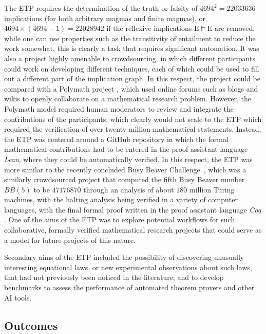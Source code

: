 \documentclass[12pt]{amsart}
\theoremstyle{definition}
\newcommand{\E}{\mathrm{E}}
\begin{document}
The ETP requires the determination of the truth or falsity of $\num{4694}^2 = \num{22033636}$ implications (for both arbitrary magmas and finite magmas), or $\num{4694} \times (\num{4694}-1) = \num{22028942}$ if the reflexive implications ${\E} \models \E$ are removed; while one can use properties such as the transitivity of entailment to reduce the work somewhat, this is clearly a task that requires significant automation. It was also a project highly amenable to crowdsourcing, in which different participants could work on developing different techniques, each of which could be used to fill out a different part of the implication graph. In this respect, the project could be compared with a Polymath project \cite{Gowers2009}, which used online forums such as blogs and wikis to openly collaborate on a mathematical research problem. However, the Polymath model required human moderators to review and integrate the contributions of the participants, which clearly would not scale to the ETP which required the verification of over twenty million mathematical statements. Instead, the ETP was centered around a GitHub repository in which the formal mathematical contributions had to be entered in the proof assistant language \emph{Lean}, where they could be automatically verified. In this respect, the ETP was more similar to the recently concluded Busy Beaver Challenge~\cite{bbchallenge_bb5}, which was a similarly crowdsourced project that computed the fifth Busy Beaver number $BB(5)$ to be $\num{47176870}$ through an analysis of about $180$ million Turing machines, with the halting analysis being verified in a variety of computer languages, with the final formal proof written in the proof assistant language \emph{Coq} \cite{the_coq_development_team_2024_14542673, bbchallenge_bb5}. One of the aims of the ETP was to explore potential workflows for such collaborative, formally verified mathematical research projects that could serve as a model for future projects of this nature.

Secondary aims of the ETP included the possibility of discovering unusually interesting equational laws, or new experimental observations about such laws, that had not previously been noticed in the literature; and to develop benchmarks to assess the performance of automated theorem provers and other AI tools.

\subsection{Outcomes}
\end{document}
